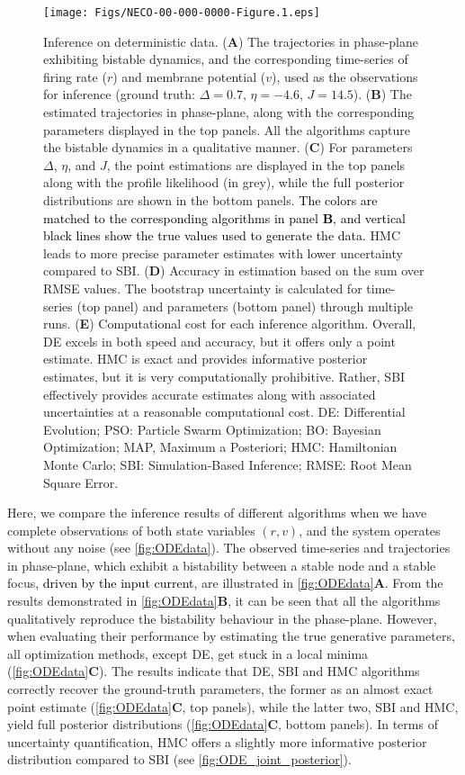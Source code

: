 \documentclass[12pt]{article}
\begin{document}
\begin{figure}[p]
    \centering
    \texttt{[image: Figs/NECO-00-000-0000-Figure.1.eps]}
    \caption{Inference on deterministic data.  
     (\textbf{A}) The trajectories in phase-plane exhibiting bistable dynamics, and the corresponding time-series of firing rate ($r$) and membrane potential ($v$), used as the observations for inference (ground truth: $\Delta=0.7$, $\eta=-4.6$, $J=14.5$). (\textbf{B}) The estimated trajectories in phase-plane, along with the corresponding parameters displayed in the top panels. All the algorithms capture the bistable dynamics in a qualitative manner. (\textbf{C}) For parameters $\Delta$, $\eta$, and $J$, the point estimations are displayed in the top panels along with the profile likelihood (in grey), while the full posterior distributions are shown in the bottom panels. \textcolor{black}{The colors are matched to the corresponding algorithms in panel \textbf{B}, and vertical black lines show the true values used to generate the data.} HMC leads to more precise parameter estimates with lower uncertainty compared to SBI.  (\textbf{D}) Accuracy in estimation based on the sum over RMSE values. The bootstrap uncertainty is calculated for time-series (top panel) and parameters (bottom panel) through multiple runs. (\textbf{E}) Computational cost for each inference algorithm.  Overall, DE excels in both speed and accuracy, but it offers only a point estimate. HMC is exact and provides informative posterior estimates, but it is very computationally prohibitive. Rather, SBI effectively provides accurate estimates along with associated uncertainties at a reasonable computational cost. DE: Differential Evolution; PSO: Particle Swarm Optimization; BO: Bayesian Optimization; MAP, Maximum a Posteriori; HMC: Hamiltonian Monte Carlo;  SBI: Simulation-Based Inference; RMSE: Root Mean Square Error.
    } 
    \label{fig:ODEdata}
\end{figure}


Here, we compare the inference results of different algorithms when we have complete observations of both state variables $(r,v)$, and the system operates without any noise (see \autoref{fig:ODEdata}). The observed time-series and trajectories in phase-plane, which exhibit a bistability between a stable node and a stable focus\textcolor{black}{, driven by the input current}, are illustrated in \autoref{fig:ODEdata}\textbf{A}. From the results demonstrated in \autoref{fig:ODEdata}\textbf{B}, it can be seen that all the algorithms qualitatively reproduce the bistability behaviour in the phase-plane. However, when evaluating their performance by estimating the true generative parameters, all optimization methods, except DE, get stuck in a local minima (\autoref{fig:ODEdata}\textbf{C}). The results indicate that DE, SBI and HMC algorithms correctly recover the ground-truth parameters, the former as an almost exact point estimate (\autoref{fig:ODEdata}\textbf{C}, top panels), while the latter two, SBI and HMC, yield full posterior distributions (\autoref{fig:ODEdata}\textbf{C}, bottom panels).  In terms of uncertainty quantification, HMC offers a slightly more informative posterior distribution compared to SBI (see \autoref{fig:ODE_joint_posterior}).
\end{document}
